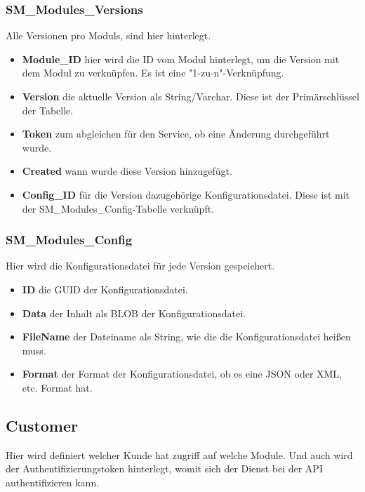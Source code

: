 \documentclass{article}
\begin{document}
\subsubsection{SM\_Modules\_Versions}

Alle Versionen pro Moduls, sind hier hinterlegt.

\begin{itemize}
  \item \textbf{Module\_ID} hier wird die ID vom Modul hinterlegt, um die Version mit dem Modul zu verknüpfen. Es ist eine "1-zu-n"-Verknüpfung.
  \item \textbf{Version} die aktuelle Version als String/Varchar. Diese ist der Primärschlüssel der Tabelle.
  \item \textbf{Token} zum abgleichen für den Service, ob eine Änderung durchgeführt wurde.
  \item \textbf{Created} wann wurde diese Version hinzugefügt.
  \item \textbf{Config\_ID} für die Version dazugehörige Konfigurationsdatei. Diese ist mit der SM\_Modules\_Config-Tabelle verknüpft. 
\end{itemize}

\subsubsection{SM\_Modules\_Config}

Hier wird die Konfigurationsdatei für jede Version gespeichert.

\begin{itemize}
  \item \textbf{ID} die GUID der Konfigurationsdatei.
  \item \textbf{Data} der Inhalt als BLOB der Konfigurationsdatei.
  \item \textbf{FileName} der Dateiname als String, wie die die Konfigurationsdatei heißen muss.
  \item \textbf{Format} der Format der Konfigurationsdatei, ob es eine JSON oder XML, etc. Format hat.
\end{itemize}

\subsection{Customer}

Hier wird definiert welcher Kunde hat zugriff auf welche Module.
Und auch wird der Authentifizierungstoken hinterlegt, womit sich der Dienst bei der API authentifizieren kann.
\end{document}
